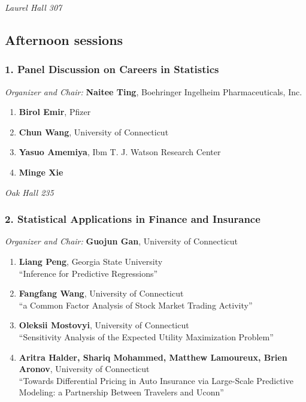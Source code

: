 \emph{Laurel Hall 307} \\[.5em]

\subsection*{Afternoon sessions}

\subsubsection*{1. Panel Discussion on Careers in Statistics}

\emph{Organizer and Chair:} \textbf{Naitee Ting}, Boehringer Ingelheim Pharmaceuticals, Inc.

\begin{enumerate}
\item \textbf{Birol Emir}, Pfizer 
\item \textbf{Chun Wang}, University of Connecticut 
\item \textbf{Yasuo Amemiya}, Ibm T. J. Watson Research Center 
\item \textbf{Minge Xie} 
\end{enumerate}

\emph{Oak Hall 235} \\[.5em]

\subsubsection*{2. Statistical Applications in Finance and Insurance}

\emph{Organizer and Chair:} \textbf{Guojun Gan}, University of Connecticut

\begin{enumerate}
\item \textbf{Liang Peng}, Georgia State University \\
``Inference for Predictive Regressions''
\item \textbf{Fangfang Wang}, University of Connecticut \\
``a Common Factor Analysis of  Stock Market Trading Activity''
\item \textbf{Oleksii Mostovyi}, University of Connecticut \\
``Sensitivity Analysis of the Expected Utility Maximization Problem''
\item \textbf{Aritra Halder, Shariq Mohammed, Matthew Lamoureux, Brien Aronov}, University of Connecticut \\
``Towards Differential Pricing in Auto Insurance via Large-Scale Predictive Modeling: a Partnership Between Travelers and Uconn''
\end{enumerate}

